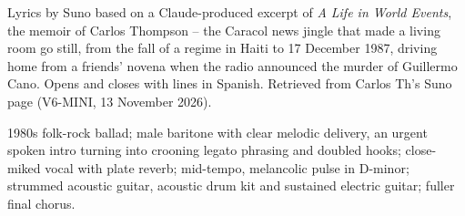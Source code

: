 
\label{sec:the-jingle-before-the-words}
\begin{notes}
Lyrics by Suno based on a Claude-produced excerpt of \emph{A Life in World Events}, the memoir of Carlos Thompson -- the Caracol news jingle that made a living room go still, from the fall of a regime in Haiti to 17 December 1987, driving home from a friends' novena when the radio announced the murder of Guillermo Cano. Opens and closes with lines in Spanish. Retrieved from Carlos Th's Suno page (V6-MINI, 13 November 2026).
\end{notes}
\begin{style}
1980s folk-rock ballad; male baritone with clear melodic delivery, an urgent spoken intro turning into crooning legato phrasing and doubled hooks; close-miked vocal with plate reverb; mid-tempo, melancolic pulse in D-minor; strummed acoustic guitar, acoustic drum kit and sustained electric guitar; fuller final chorus.
\end{style}
